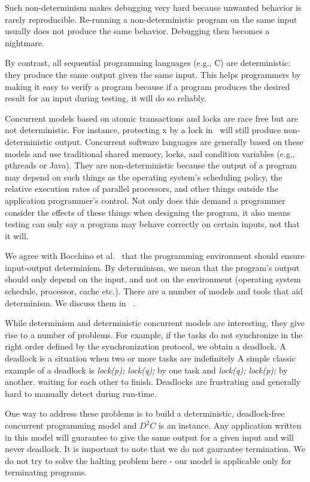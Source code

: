 \documentclass[10pt, conference, compsocconf]{IEEEtran}
\begin{document}
Such non-determinism makes debugging very hard because unwanted behavior is 
rarely reproducible. Re-running a non-deterministic program on the same input usually does not 
produce the same behavior. Debugging then becomes a nightmare. 


By contrast, all sequential programming languages (e.g., C) are deterministic: they produce 
the same output given the same input. This helps programmers by 
making it easy to verify a program because if a program 
produces the desired result for an input during testing, it will do so reliably. 

Concurrent models based on atomic transactions and locks are race free but are not deterministic. 
For instance, protecting x by a lock in~ will still produce non-deterministic output. Concurrent software languages are generally based on these models and use traditional shared memory, 
locks, and condition variables (e.g., pthreads or Java). They are non-deterministic because 
the output of a program may depend on such things as the operating system’s scheduling policy, 
the relative execution rates of parallel processors, and other things outside the application programmer’s control. Not only does this demand a programmer consider the effects of these things 
when designing the program, it also means testing can only say a program may behave correctly 
on certain inputs, not that it will. 

We agree with Bocchino et al.~\cite{bocchino2009parallel}  that the programming environment should ensure input-output 
determinism. By determinism, we mean that the program’s output should only depend on the input, 
and not on the environment (operating system schedule, processor, cache etc.). There are a number
of models and tools that aid determinism. We discuss them in ~.

While determinism and deterministic concurrent models are interesting, they give rise to a number of problems. 
For example, if the tasks do not synchronize in the right order deﬁned by the synchronization 
protocol, we obtain a deadlock.
A deadlock is a situation when two or more tasks are indeﬁnitely 
 A simple classic example of a deadlock is \emph{lock(p); lock(q);}
by one task and \emph{lock(q); lock(p);} by another. 
waiting for each other to ﬁnish. 
Deadlocks are frustrating and generally hard to manually detect 
during run-time. 

One way to address these problems is to build a deterministic, deadlock-free concurrent programming
model and $D^2C$ is an instance. 
Any application written in this model will guarantee to give 
the same output for a given input
and will never deadlock. 
It is important to note that we do not gaurantee termination.
We do not try to solve the halting problem here - our model is applicable
only for terminating programs.
\end{document}

